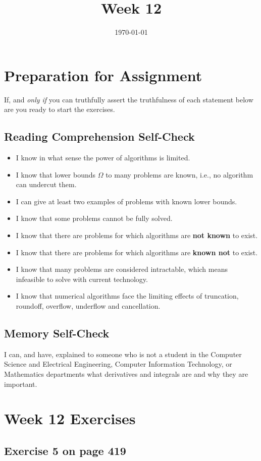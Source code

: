 \documentclass[12pt]{amsart}
\title{Week 12}
\date{\today}
\begin{document}
\maketitle

\section{Preparation for Assignment}
If, and \textit{only if} you can truthfully assert the truthfulness of each statement below are you ready to start the exercises.
\subsection {Reading Comprehension Self-Check}
\begin{itemize}
\item  I know in what sense the power of algorithms is limited.
\item  I know that lower bounds $\Omega$ to many problems are known, i.e., no
    algorithm can undercut them.
\item  I can give at least two examples of problems with known lower bounds.
\item  I know that some problems cannot be fully solved.
\item  I know that there are problems for which algorithms are \textbf{not known} to
    exist.
\item  I know that there are problems for which algorithms are \textbf{known not} to
    exist.
\item  I know that many problems are considered intractable, which means
    infeasible to solve with current technology.
\item  I know that numerical algorithms face the limiting effects of
    truncation, roundoff, overflow, underflow and cancellation.

\end{itemize}
\subsection{Memory Self-Check}
I can, and have, explained to someone who is not a student in the Computer Science and Electrical Engineering, Computer Information Technology, or Mathematics departments what derivatives and integrals are and why they are important. 
 \section{Week 12 Exercises}
\subsection{ Exercise 5 on page 419}
\end{document}

